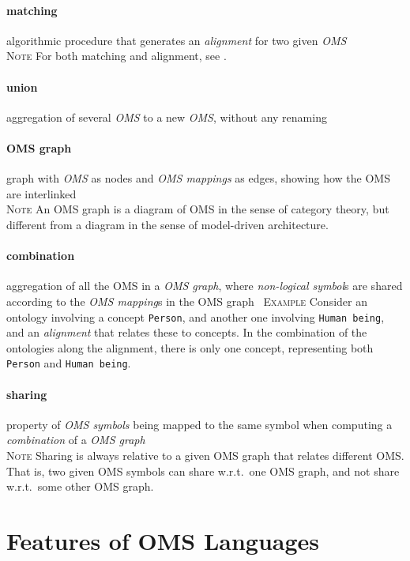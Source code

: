 \documentclass[10pt,%
\ifpretendfinal
final%
\else
draft%
\fi,
]{scrreprt}
\newcommand*{\termref}[1]{\textit{#1}}
\newcommand{\sclause}[1]{\section{#1}}
\newcommand{\termdefinition}[2]{\paragraph{#1} #2}
\newenvironment{definitions}[0]{\medskip }{}
\newenvironment{note}[0]{\ \\ \textsc{Note} \quad}{}
\newenvironment{example}[0]{\ \newline \textsc{Example}\quad }{}
\begin{document}
\begin{definitions}
  \termdefinition{matching}{algorithmic procedure that generates an \termref{alignment} for two given \termref{OMS}}
  \begin{note}
    For both matching and alignment, see \cite{DBLP:books/daglib/0032976,KhanKeet13}.
  \end{note}

  \termdefinition{union}{aggregation of several \termref{OMS}
    to a new \termref{OMS}, without any renaming}
 
\termdefinition{OMS graph} graph with \termref{OMS} as nodes and \termref{OMS mappings} as edges, showing how the OMS are interlinked
  \begin{note}
    An OMS graph is a diagram of OMS in the sense of category theory, but different from a diagram
    in the sense of model-driven architecture.
  \end{note}



  \termdefinition{combination}{aggregation of all the OMS in a \termref{OMS graph}, where \termref{non-logical symbol}s are shared according to the \termref{OMS mapping}s in the OMS graph}
\begin{example}
Consider an ontology involving a concept \texttt{Person},
and another one involving \texttt{Human being}, and an \termref{alignment}
that relates these to concepts. In the combination of the ontologies
along the alignment, there is only one concept, representing both
\texttt{Person} and \texttt{Human being}.
\end{example}

 
  \termdefinition{sharing}{property of \termref{OMS symbols} being mapped to the same symbol when computing a \termref{combination} of a \termref{OMS graph}}
 \begin{note}
  Sharing is always relative to a given OMS graph that
  relates different OMS. That is, two given OMS symbols
  can share w.r.t.\ one OMS graph, and not share w.r.t.\ some
  other OMS graph.
 \end{note}

\end{definitions}

\sclause{Features of OMS Languages}
 
\end{document}
